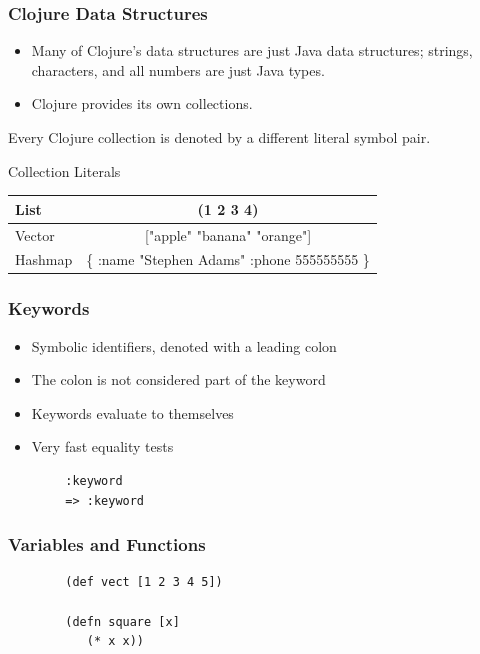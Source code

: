 \documentclass[xcolor=dvipsnames]{beamer}
\begin{document}
		\begin{frame}[fragile]
		\frametitle{Clojure Data Structures}
			\begin{itemize}			
			\item Many of Clojure's data structures are just Java data structures; strings, characters, and all numbers are just Java types.
			\pause
			\item Clojure provides its own collections.
			\end{itemize}
		\end{frame}
		\begin{frame}
		Every Clojure collection is denoted by a different literal symbol pair.
			\begin{block}{Collection Literals}
				\begin{table}[H]
				\begin{tabular}{ | l | c | }
				\hline
				List & (1 2 3 4) \\ \hline
				Vector & ["apple" "banana" "orange"] \\ \hline
				Hashmap & \{ :name "Stephen Adams" :phone 555555555 \} \\ \hline
				\end{tabular}
				\end{table}
			\end{block}
		\end{frame}
		
		\begin{frame}[fragile]
		\frametitle{Keywords}
		\begin{itemize}
			\item Symbolic identifiers, denoted with a leading colon
			\item The colon is not considered part of the keyword
			\item Keywords evaluate to themselves
			\item Very fast equality tests 
		\end{itemize}
		\begin{verbatim}
		:keyword
		=> :keyword
		\end{verbatim}
		\end{frame}
		
		\begin{frame}[fragile]
		\frametitle{Variables and Functions}
		\begin{verbatim}
		(def vect [1 2 3 4 5])
		
		(defn square [x] 
		   (* x x))
		\end{verbatim}	
		\end{frame}
		
\end{document}
